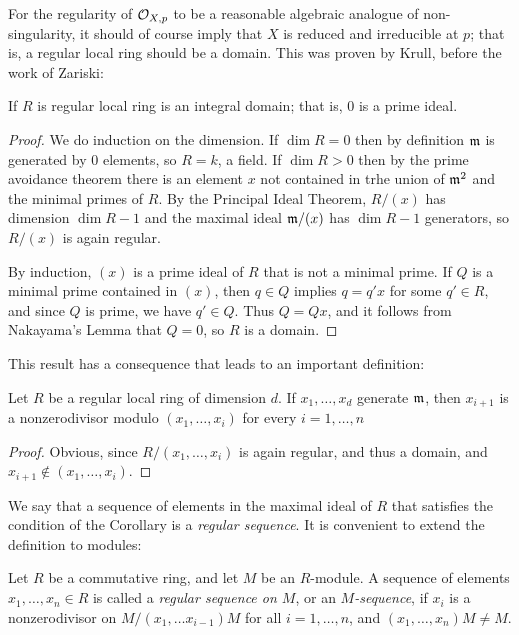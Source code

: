 For the regularity of $\sO_{X,p}$ to be a reasonable algebraic analogue of non-singularity, it should of course imply
that $X$ is reduced and irreducible at $p$; that is, a regular local ring should be a domain. This was proven by Krull, before the work of Zariski:

\begin{proposition}
 If $R$ is regular local ring is an integral domain; that is, 0 is a prime ideal.
\end{proposition}
\begin{proof}
 We do induction on the dimension. If $\dim R = 0$ then by definition $\gm$ is generated by 0 elements, so $R = k$,
 a field. If $\dim R>0$ then by the prime avoidance theorem \cite[]{E} there is an element $x$ not contained in trhe union of $\gm^{2}$ and the minimal primes of $R$. By the Principal Ideal Theorem, $R/(x)$ has dimension $\dim R -1$ and the maximal ideal $\gm/(x)$ has $\dim R-1$ generators, so $R/(x)$ is again regular.
 
 By induction, $(x)$ is a prime ideal of $R$ that is not a minimal prime. If $Q$ is a minimal prime contained in $(x)$,
 then $q\in Q$ implies $q = q'x$ for some $q'\in R$, and since $Q$ is prime, we have $q'\in Q$. Thus
 $Q = Qx$, and it follows from Nakayama's Lemma that $Q=0$, so $R$ is a domain.
\end{proof}

This result has a consequence that leads to an important definition:

\begin{corollary}
 Let $R$ be a regular local ring of dimension $d$. If $x_{1}, \dots, x_{d}$  generate $\gm$, then 
 $x_{i+1}$ is a nonzerodivisor modulo $(x_{1}, \dots, x_{i})$ for every $i = 1,\dots, n$
\end{corollary}
\begin{proof}
 Obvious, since $R/(x_{1},\dots, x_{i})$ is again regular, and thus a domain, and $x_{i+1}\notin (x_{1},\dots,x_{i})$.
\end{proof}

We say that a sequence of elements in the maximal ideal of $R$ that satisfies the condition of the Corollary is a \emph{regular sequence}. It is convenient to extend
the definition to modules:

\begin{definition}
 Let $R$ be a commutative ring, and let $M$ be an $R$-module. A sequence of
 elements $x_{1}, \dots, x_{n}\in R$ is called a \emph{regular sequence on $M$}, or an
 \emph{$M$-sequence}, if
 $x_{i}$ is a nonzerodivisor on $M/(x_{1}, \dots x_{i-1})M$  for all $i= 1,\dots, n$, and 
 $(x_{1}, \dots, x_{n})M \neq M$.
\end{definition}

